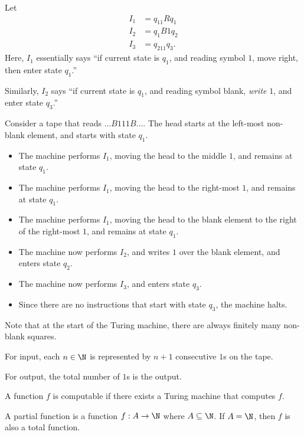 \documentclass[10pt]{mypackage}
\begin{document}
\begin{example}
  Let
  \begin{align*}
    I_1 &= q_11Rq_1\\
    I_2 &= q_1B1q_2\\
    I_3 &= q_211q_3.
  \end{align*}
  Here, $I_1$ essentially says ``if current state is $q_1$, and reading symbol $1$, move right, then enter state $q_1$.''\newline

  Similarly, $I_2$ says ``if current state is $q_1$, and reading symbol blank, \textit{write} $1$, and enter state $q_3$.''\newline

  Consider a tape that reads $\dots B111B\dots$. The head starts at the left-most non-blank element, and starts with state $q_1$.
  \begin{itemize}
    \item The machine performs $I_1$, moving the head to the middle $1$, and remains at state $q_1$.
    \item The machine performs $I_1$, moving the head to the right-most $1$, and remains at state $q_1$.
    \item The machine performs $I_1$, moving the head to the blank element to the right of the right-most $1$, and remains at state $q_1$.
    \item The machine now performs $I_2$, and writes $1$ over the blank element, and enters state $q_2$.
    \item The machine now performs $I_3$, and enters state $q_3$.
    \item Since there are no instructions that start with state $q_3$, the machine halts.
  \end{itemize}
  Note that at the start of the Turing machine, there are always finitely many non-blank squares.
\end{example}
\begin{notation}
  For input, each $n\in \N$ is represented by $n+1$ consecutive $1$s on the tape.\newline

  For output, the total number of $1$s is the output.
\end{notation}
\begin{definition}[Computable]
  A function $f$ is computable if there exists a Turing machine that computes $f$.
\end{definition}
\begin{definition}
  A partial function is a function $f: A\rightarrow \N$ where $A\subseteq \N$. If $A = \N$, then $f$ is also a total function.
\end{definition}
\end{document}
